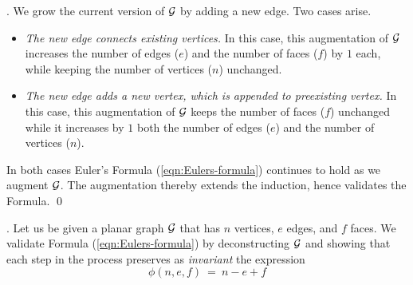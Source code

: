 .
We grow the current version of $\mbox{$\cal G$}$ by adding a new edge.  Two cases arise.
\begin{itemize}
\item
{\em The new edge connects existing vertices.}
In this case, this augmentation of $\mbox{$\cal G$}$ increases the number of edges ($e$) and the
number of faces ($f$) by $1$ each, while keeping the number of vertices
($n$) unchanged.

\item
{\em The new edge adds a new vertex, which is appended to preexisting vertex.}
In this case, this augmentation of $\mbox{$\cal G$}$ keeps the number of faces ($f$) unchanged while
it increases by $1$ both the number of edges ($e$) and the number of vertices ($n$). 
\end{itemize}
In both cases Euler's Formula (\ref{eqn:Eulers-formula}) continues to hold as we augment
$\mbox{$\cal G$}$.  The augmentation thereby extends the induction, hence validates the Formula.
\qed

\bigskip


.
Let us be given a planar graph $\mbox{$\cal G$}$ that has $n$ vertices, $e$ edges, and $f$
faces.  We validate Formula (\ref{eqn:Eulers-formula}) by deconstructing $\mbox{$\cal G$}$ and showing
that each step in the process preserves as {\it invariant} the expression
\begin{equation}
\label{eq:phi-in-euler-formula}
 \phi(n,e,f) \ = \ n-e+f
\end{equation}

\bigskip

\noindent {}
\bigskip

